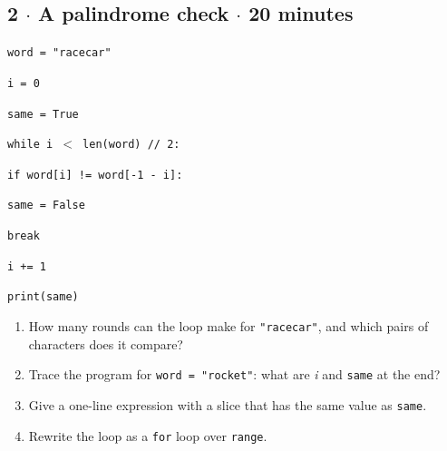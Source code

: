 \documentclass[11pt]{article}
\begin{document}
\begin{keepsection}
\begin{keepsection}
\end{keepsection}

\begin{keepsection}
\subsection{2 \ensuremath{\cdot} A palindrome check \ensuremath{\cdot} 20 minutes}
\begin{tcolorbox}[colback=Paperblue,colframe=Paperblue,boxrule=0pt,arc=0pt,left=7pt,right=7pt,top=5pt,bottom=5pt]\small\sloppy
\noindent\hspace*{0em}\texttt{word = "racecar"}\par
\noindent\hspace*{0em}\texttt{i = 0}\par
\noindent\hspace*{0em}\texttt{same = True}\par
\noindent\hspace*{0em}\texttt{while i \ensuremath{<} len(word) // 2:}\par
\noindent\hspace*{1em}\texttt{if word[i] != word[-1 - i]:}\par
\noindent\hspace*{3em}\texttt{same = False}\par
\noindent\hspace*{3em}\texttt{break}\par
\noindent\hspace*{1em}\texttt{i += 1}\par
\noindent\hspace*{0em}\texttt{print(same)}\par
\end{tcolorbox}

\begin{enumerate}
\item How many rounds can the loop make for \texttt{"racecar"}, and which pairs of characters does it compare?
\item Trace the program for \texttt{word = "rocket"}: what are \textit{i} and \texttt{same} at the end?
\item Give a one-line expression with a slice that has the same value as \texttt{same}.
\item Rewrite the loop as a \texttt{for} loop over \texttt{range}.
\end{enumerate}

\end{keepsection}
\end{keepsection}
\end{document}
